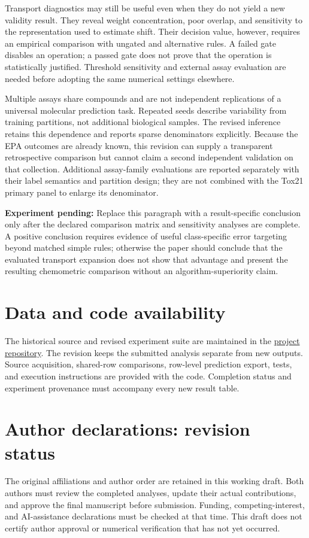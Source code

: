 \documentclass[11pt]{article}
\newcommand{\pending}[1]{\par\noindent\textbf{Experiment pending:} #1\par}
\begin{document}
Transport diagnostics may still be useful even when they do not yield a new validity result. They reveal weight concentration, poor overlap, and sensitivity to the representation used to estimate shift. Their decision value, however, requires an empirical comparison with ungated and alternative rules. A failed gate disables an operation; a passed gate does not prove that the operation is statistically justified. Threshold sensitivity and external assay evaluation are needed before adopting the same numerical settings elsewhere.

Multiple assays share compounds and are not independent replications of a universal molecular prediction task. Repeated seeds describe variability from training partitions, not additional biological samples. The revised inference retains this dependence and reports sparse denominators explicitly. Because the EPA outcomes are already known, this revision can supply a transparent retrospective comparison but cannot claim a second independent validation on that collection. Additional assay-family evaluations are reported separately with their label semantics and partition design; they are not combined with the Tox21 primary panel to enlarge its denominator.

\pending{Replace this paragraph with a result-specific conclusion only after the declared comparison matrix and sensitivity analyses are complete. A positive conclusion requires evidence of useful class-specific error targeting beyond matched simple rules; otherwise the paper should conclude that the evaluated transport expansion does not show that advantage and present the resulting chemometric comparison without an algorithm-superiority claim.}

\section*{Data and code availability}
The historical source and revised experiment suite are maintained in the \href{https://github.com/DCarchimonde/aidd-paper-factory}{project repository}. The revision keeps the submitted analysis separate from new outputs. Source acquisition, shared-row comparisons, row-level prediction export, tests, and execution instructions are provided with the code. Completion status and experiment provenance must accompany every new result table.

\section*{Author declarations: revision status}
The original affiliations and author order are retained in this working draft. Both authors must review the completed analyses, update their actual contributions, and approve the final manuscript before submission. Funding, competing-interest, and AI-assistance declarations must be checked at that time. This draft does not certify author approval or numerical verification that has not yet occurred.
\end{document}
